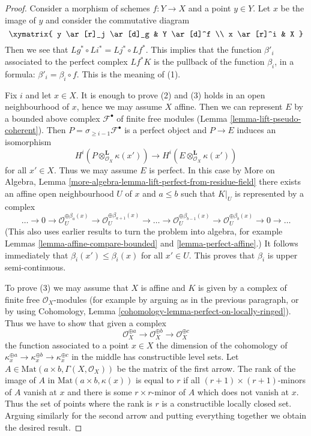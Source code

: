 \begin{proof}
Consider a morphism of schemes $f : Y \to X$ and a point $y \in Y$.
Let $x$ be the image of $y$ and consider the commutative diagram
$$
\xymatrix{
y \ar[r]_j \ar[d]_g & Y \ar[d]^f \\
x \ar[r]^i & X
}
$$
Then we see that $Lg^* \circ Li^* = Lj^* \circ Lf^*$. This implies that
the function $\beta'_i$ associated to the perfect complex $Lf^*K$
is the pullback of the function $\beta_i$, in a formula:
$\beta'_i = \beta_i \circ f$. This is the meaning of (1).

\medskip\noindent
Fix $i$ and let $x \in X$. It is enough to prove (2) and (3)
holds in an open neighbourhood of $x$, hence we may assume $X$ affine.
Then we can represent $E$ by a bounded above complex $\mathcal{F}^\bullet$
of finite free modules (Lemma \ref{lemma-lift-pseudo-coherent}).
Then $P = \sigma_{\geq i - 1}\mathcal{F}^\bullet$ is a perfect object
and $P \to E$ induces an isomorphism
$$
H^i(P \otimes_{\mathcal{O}_X}^\mathbf{L} \kappa(x')) \to
H^i(E \otimes_{\mathcal{O}_X}^\mathbf{L} \kappa(x'))
$$
for all $x' \in X$. Thus we may assume $E$ is perfect. In this case
by More on Algebra, Lemma
\ref{more-algebra-lemma-lift-perfect-from-residue-field}
there exists an affine open neighbourhood $U$ of $x$ and
$a \leq b$ such that $K|_U$ is represented by a complex
$$
\ldots \to 0 \to \mathcal{O}_U^{\oplus \beta_a(x)}
\to \mathcal{O}_U^{\oplus \beta_{a + 1}(x)} \to
\ldots \to
\mathcal{O}_U^{\oplus \beta_{b - 1}(x)} \to
\mathcal{O}_U^{\oplus \beta_b(x)} \to 0
\to \ldots
$$
(This also uses earlier results to turn the problem into algebra, for example
Lemmas \ref{lemma-affine-compare-bounded} and
\ref{lemma-perfect-affine}.)
It follows immediately that $\beta_i(x') \leq \beta_i(x)$
for all $x' \in U$. This proves that $\beta_i$ is upper
semi-continuous.

\medskip\noindent
To prove (3) we may assume that $X$ is affine and
$K$ is given by a complex of finite
free $\mathcal{O}_X$-modules (for example by arguing as in the previous
paragraph, or by using Cohomology, Lemma
\ref{cohomology-lemma-perfect-on-locally-ringed}).
Thus we have to show that given a complex
$$
\mathcal{O}_X^{\oplus a} \to
\mathcal{O}_X^{\oplus b} \to
\mathcal{O}_X^{\oplus c}
$$
the function associated to a point $x \in X$ the dimension of the cohomology
of $\kappa_x^{\oplus a} \to \kappa_x^{\oplus b} \to \kappa_x^{\oplus c}$
in the middle has constructible level sets. Let
$A \in \text{Mat}(a \times b, \Gamma(X, \mathcal{O}_X))$ be the matrix
of the first arrow. The rank of the image of $A$ in
$\text{Mat}(a \times b, \kappa(x))$ is equal to $r$ if all
$(r + 1) \times (r + 1)$-minors of $A$ vanish at $x$ and there is some
$r \times r$-minor of $A$ which does not vanish at $x$. Thus the set
of points where the rank is $r$ is a constructible locally closed set.
Arguing similarly for the second arrow and putting everything together
we obtain the desired result.
\end{proof}


